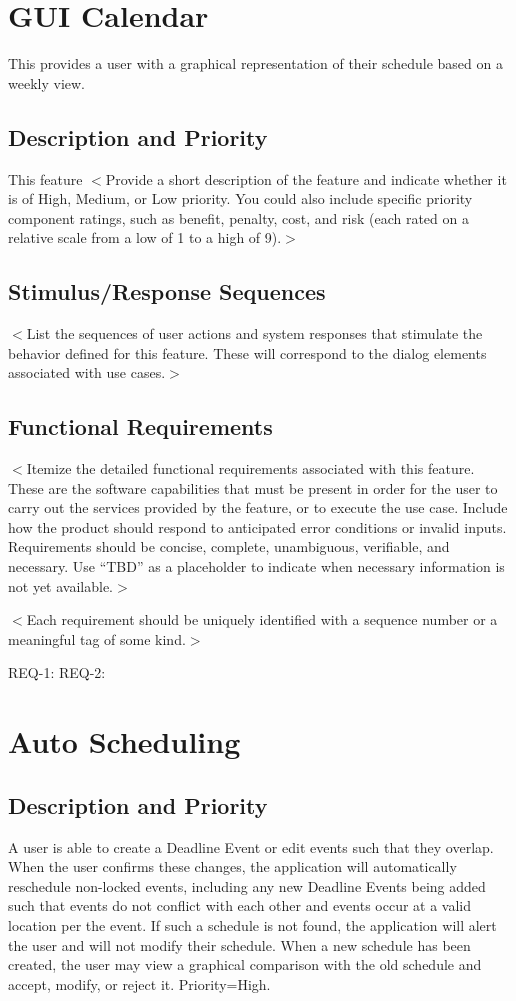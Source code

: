 \documentclass{scrreprt}
\begin{document}
\section{GUI Calendar}
This provides a user with a graphical representation of their schedule based on a weekly view.

\subsection{Description and Priority}
This feature
$<$Provide a short description of the feature and indicate whether it is of 
High, Medium, or Low priority. You could also include specific priority 
component ratings, such as benefit, penalty, cost, and risk (each rated on a 
relative scale from a low of 1 to a high of 9).$>$

\subsection{Stimulus/Response Sequences}
$<$List the sequences of user actions and system responses that stimulate the 
behavior defined for this feature. These will correspond to the dialog elements 
associated with use cases.$>$

\subsection{Functional Requirements}
$<$Itemize the detailed functional requirements associated with this feature.  
These are the software capabilities that must be present in order for the user 
to carry out the services provided by the feature, or to execute the use case.  
Include how the product should respond to anticipated error conditions or 
invalid inputs. Requirements should be concise, complete, unambiguous, 
verifiable, and necessary. Use “TBD” as a placeholder to indicate when necessary 
information is not yet available.$>$

$<$Each requirement should be uniquely identified with a sequence number or a 
meaningful tag of some kind.$>$

REQ-1:	REQ-2:

\section{Auto Scheduling}

\subsection{Description and Priority}
A user is able to create a Deadline Event or edit events such that they overlap.
When the user confirms these changes, the application will automatically reschedule
non-locked events, including any new Deadline Events being added such that events
do not conflict with each other and events occur at a valid location per the event.
If such a schedule is not found, the application will alert the user and will not
modify their schedule. When a new schedule has been created, the user may view a
graphical comparison with the old schedule and accept, modify, or reject it.
Priority=High.
\end{document}
